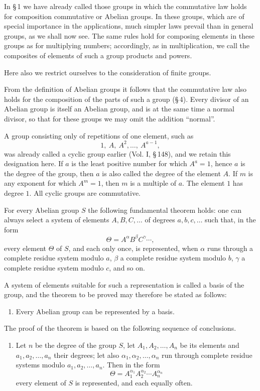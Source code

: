 \documentclass[11pt]{article}
\begin{document}
In \S\,1 we have already called those groups in which the commutative law holds for composition commutative or Abelian groups. In these groups, which are of special importance in the applications, much simpler laws prevail than in general groups, as we shall now see. The same rules hold for composing elements in these groups as for multiplying numbers; accordingly, as in multiplication, we call the composites of elements of such a group products and powers.

Here also we restrict ourselves to the consideration of finite groups.

From the definition of Abelian groups it follows that the commutative law also holds for the composition of the parts of such a group (\S\,4). Every divisor of an Abelian group is itself an Abelian group, and is at the same time a normal divisor, so that for these groups we may omit the addition ``normal''.

A group consisting only of repetitions of one element, such as
\[
1,\ A,\ A^2,\ldots,\ A^{a-1},
\]
was already called a cyclic group earlier (Vol. I, \S\,148), and we retain this designation here. If $a$ is the least positive number for which $A^a=1$, hence $a$ is the degree of the group, then $a$ is also called the degree of the element $A$. If $m$ is any exponent for which $A^m=1$, then $m$ is a multiple of $a$. The element $1$ has degree $1$. All cyclic groups are commutative.

For every Abelian group $S$ the following fundamental theorem holds: one can always select a system of elements $A,B,C,\ldots$ of degrees $a,b,c,\ldots$ such that, in the form
\[
\Theta=A^\alpha B^\beta C^\gamma\cdots,
\]
every element $\Theta$ of $S$, and each only once, is represented, when $\alpha$ runs through a complete residue system modulo $a$, $\beta$ a complete residue system modulo $b$, $\gamma$ a complete residue system modulo $c$, and so on.

A system of elements suitable for such a representation is called a basis of the group, and the theorem to be proved may therefore be stated as follows:

\begin{enumerate}[label=\Roman*.]
\item Every Abelian group can be represented by a basis.
\end{enumerate}

The proof of the theorem is based on the following sequence of conclusions.

\begin{enumerate}[label=\arabic*.]
\item Let $n$ be the degree of the group $S$, let $A_1,A_2,\ldots,A_n$ be its elements and $a_1,a_2,\ldots,a_n$ their degrees; let also $\alpha_1,\alpha_2,\ldots,\alpha_n$ run through complete residue systems modulo $a_1,a_2,\ldots,a_n$. Then in the form
\begin{equation}
\Theta=A_1^{\alpha_1}A_2^{\alpha_2}\cdots A_n^{\alpha_n}
\tag{1}
\end{equation}
every element of $S$ is represented, and each equally often.
\end{enumerate}
\end{document}
